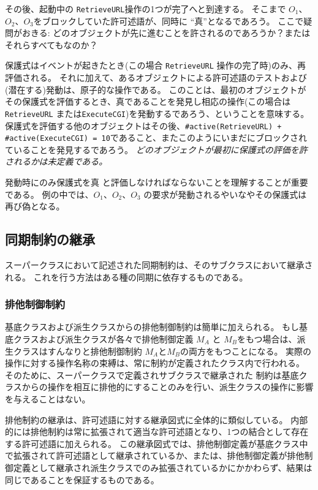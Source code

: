 \documentclass[\pformat,12pt]{jarticle}
\begin{document}
その後、起動中の \texttt{RetrieveURL}操作の1つが完了へと到達する。
そこまで $O_1$、$O_2$、$O_3$をブロックしていた許可述語が、同時に ``真''となるであろう。
ここで疑問がおきる: どのオブジェクトが先に進むことを許されるのであろうか？またはそれらすべてもなのか？ 

保護式はイベントが起きたとき(この場合 \texttt{RetrieveURL} 操作の完了時)のみ、再評価される。
それに加えて、あるオブジェクトによる許可述語のテストおよび(潜在する)発動は、原子的な操作である。
このことは、最初のオブジェクトがその保護式を評価するとき、真であることを発見し相応の操作(この場合は\texttt{RetrieveURL} または\texttt{ExecuteCGI})を発動するであろう、ということを意味する。
保護式を評価する他のオブジェクトはその後、\texttt{\#active(RetrieveURL) + \#active(ExecuteCGI) = 10}であること、またこのようにいまだにブロックされていることを発見するであろう。
 \textit{どのオブジェクトが最初に保護式の評価を許されるかは未定義である。}

発動時にのみ保護式を\textsf{真} と評価しなければならないことを理解することが重要である。
例の中では、$O_1$、$O_2$、$O_3$ の要求が発動されるやいなやその保護式は再び偽となる。


\subsection{同期制約の継承}
\label{ch:sync-inh}

スーパークラスにおいて記述された同期制約は、そのサブクラスにおいて継承される。
これを行う方法はある種の同期に依存するものである。

\subsubsection{排他制御制約}
基底クラスおよび派生クラスからの排他制御制約は簡単に加えられる。
もし基底クラスおよび派生クラスが各々で排他制御定義 {$M_{A}$} と {$M_{B}$}をもつ場合は、派生クラスはすんなりと排他制御制約 {$M_{A}$}と{$M_{B}$}の両方をもつことになる。
実際の操作に対する操作名称の束縛は、常に制約が定義されたクラス内で行われる。
そのために、スーパークラスで定義されサブクラスで継承された 制約は基底クラスからの操作を相互に排他的にすることのみを行い、派生クラスの操作に影響を与えることはない。

排他制約の継承は、許可述語に対する継承図式に全体的に類似している。
内部的には排他制約は常に拡張されて適当な許可述語となり、1つの結合として存在する許可述語に加えられる。
この継承図式では、排他制御定義が基底クラス中で拡張されて許可述語として継承されているか、または、排他制御定義が排他制御定義として継承され派生クラスでのみ拡張されているかにかかわらず、結果は同じであることを保証するものである。
\end{document}

